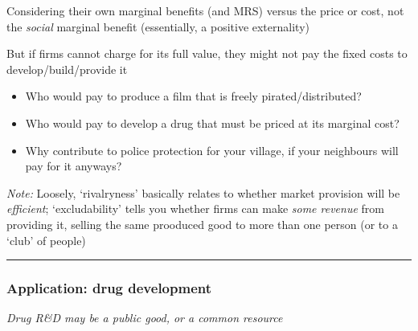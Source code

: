 \documentclass[]{article}
\providecommand{\tightlist}{%
  \setlength{\itemsep}{0pt}\setlength{\parskip}{0pt}}
\begin{document}
\bigskip

Considering their own marginal benefits (and MRS) versus the price or cost, not the \emph{social} marginal benefit (essentially, a positive externality)

\bigskip

But if firms cannot charge for its full value, they might not pay the fixed costs to develop/build/provide it

\begin{itemize}
\tightlist
\item
  Who would pay to produce a film that is freely pirated/distributed?
\item
  Who would pay to develop a drug that must be priced at its marginal cost?
\item
  Why contribute to police protection for your village, if your neighbours will pay for it anyways?
\end{itemize}

\emph{Note:} Loosely, `rivalryness' basically relates to whether market provision will be \emph{efficient}; `excludability' tells you whether firms can make \emph{some revenue} from providing it, selling the same prooduced good to more than one person (or to a `club' of people)

\begin{center}\rule{0.5\linewidth}{\linethickness}\end{center}

\hypertarget{application-drug-development}{%
\subsubsection{Application: drug development}\label{application-drug-development}}

\emph{Drug R\&D may be a public good, or a common resource}
\end{document}
